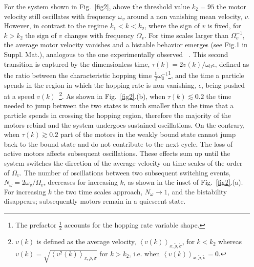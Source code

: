 \documentclass[prl,aps,twocolumn, floatfix, superscriptaddress,showpacs]{revtex4}
\begin{document}
For the system shown in Fig.~\ref{fig2}, above the threshold value $k_2=95$ the motor velocity still oscillates with frequency $\omega_v$ around a non vanishing mean velocity, $v$. However, in contrast to the regime $k_1< k<k_2$, where the sign of $v$ is fixed, for $k>k_2$ the sign of $v$ changes with frequency $\Omega_v$. For time scales larger than $\Omega_v^{-1}$, the average motor  velocity  vanishes and a bistable behavior emerges (see Fig.1 in Suppl. Mat.), analogous to the one experimentally observed~ \cite{Ma,Warshaw,Kunwar2011,badoual,Nebenfuhr01121999,Hendricks,goldman2010,Guerin-review}. 
This second transition is captured by the dimensionless time, $\tau(k)=2 v(k)/\omega_0\epsilon$, defined as the ratio between the characteristic hopping time $\frac{1}{2}\omega_0^{-1}$\footnote{The prefactor $\frac{1}{2}$ accounts for the  hopping rate variable shape.}, and the time a particle spends in the region in which the hopping rate is non vanishing, $\epsilon$, being pushed at a speed $v(k)$~\footnote{$v(k)$ is defined as the average velocity, $\left\langle v(k) \right\rangle_{x,\tilde \rho, \tilde \sigma}$, for $k<k_2$ whereas $v(k)=\sqrt{\left\langle v^2(k)\right\rangle_{x,\tilde \rho, \tilde \sigma}}$ for $k>k_2$, i.e. when $\left\langle v(k) \right\rangle_{x,\tilde \rho, \tilde \sigma}=0$.}. As shown in Fig.~\ref{fig2}.(b), when $\tau(k)\lesssim 0.2$ the time needed to jump between the two states is much smaller than the time that a particle spends in crossing the hopping region, therefore the majority of the motors rebind and the system undergoes sustained oscillations. On the contrary, when $\tau(k) \gtrsim 0.2$ part of the motors in the weakly bound state cannot jump back to the bound state and do not contribute to the next cycle. The loss of active motors affects subsequent oscillations. These effects sum up until the system switches the direction of the average velocity on time scales of the order of $\Omega_v$. The number of oscillations between two subsequent switching events,  $N_{\omega}=2\omega_v/\Omega_v$, decreases for 
increasing $k$, as shown in the inset of Fig.~\ref{fig2}.(a). For increasing $k$ the two time scales approach, $N_{\omega}\rightarrow 1$, and the bistability disappears; subsequently motors remain in a quiescent state.
\end{document}
